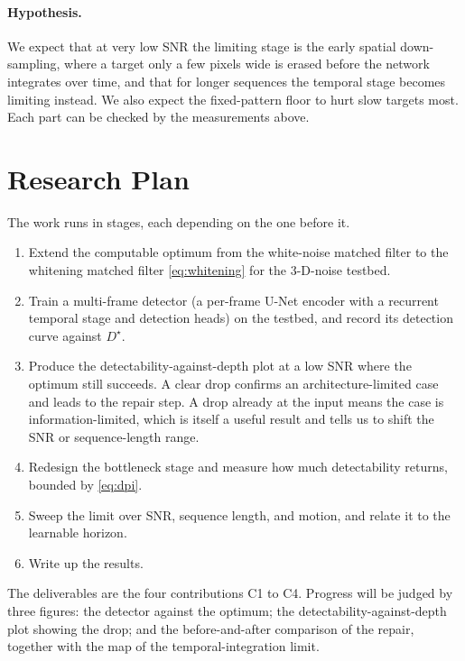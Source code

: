 \documentclass[11pt]{article}
\begin{document}
\paragraph{Hypothesis.} We expect that at very low SNR the limiting stage is the
early spatial down-sampling, where a target only a few pixels wide is erased
before the network integrates over time, and that for longer sequences the
temporal stage becomes limiting instead. We also expect the fixed-pattern floor
to hurt slow targets most. Each part can be checked by the measurements above.

\section{Research Plan}

The work runs in stages, each depending on the one before it.
\begin{enumerate}
\item Extend the computable optimum from the white-noise matched filter to the
whitening matched filter \eqref{eq:whitening} for the 3-D-noise testbed.
\item Train a multi-frame detector (a per-frame U-Net encoder with a recurrent
temporal stage and detection heads) on the testbed, and record its detection
curve against $D^\star$.
\item Produce the detectability-against-depth plot at a low SNR where the optimum
still succeeds. A clear drop confirms an architecture-limited case and leads to
the repair step. A drop already at the input means the case is
information-limited, which is itself a useful result and tells us to shift the
SNR or sequence-length range.
\item Redesign the bottleneck stage and measure how much detectability returns,
bounded by \eqref{eq:dpi}.
\item Sweep the limit over SNR, sequence length, and motion, and relate it to the
learnable horizon.
\item Write up the results.
\end{enumerate}
The deliverables are the four contributions C1 to C4. Progress will be judged by
three figures: the detector against the optimum; the
detectability-against-depth plot showing the drop; and the before-and-after
comparison of the repair, together with the map of the temporal-integration limit.
\end{document}

